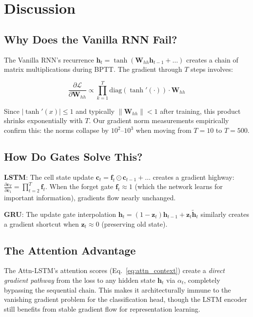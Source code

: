 \documentclass[12pt, a4paper]{article}
\begin{document}
\section{Discussion}

\subsection{Why Does the Vanilla RNN Fail?}

The Vanilla RNN's recurrence $\mathbf{h}_t = \tanh(\mathbf{W}_{hh}\mathbf{h}_{t-1} + \ldots)$ creates a chain of matrix multiplications during BPTT. The gradient through $T$ steps involves:

\begin{equation}
    \frac{\partial \mathcal{L}}{\partial \mathbf{W}_{hh}} \propto \prod_{k=1}^{T} \text{diag}(\tanh'(\cdot)) \cdot \mathbf{W}_{hh}
\end{equation}

Since $|\tanh'(x)| \leq 1$ and typically $\|\mathbf{W}_{hh}\| < 1$ after training, this product shrinks exponentially with $T$. Our gradient norm measurements empirically confirm this: the norms collapse by $10^2$--$10^3$ when moving from $T=10$ to $T=500$.

\subsection{How Do Gates Solve This?}

\textbf{LSTM}: The cell state update $\mathbf{c}_t = \mathbf{f}_t \odot \mathbf{c}_{t-1} + \ldots$ creates a gradient highway: $\frac{\partial \mathbf{c}_T}{\partial \mathbf{c}_1} = \prod_{t=2}^{T} \mathbf{f}_t$. When the forget gate $\mathbf{f}_t \approx 1$ (which the network learns for important information), gradients flow nearly unchanged.

\textbf{GRU}: The update gate interpolation $\mathbf{h}_t = (1-\mathbf{z}_t)\mathbf{h}_{t-1} + \mathbf{z}_t\tilde{\mathbf{h}}_t$ similarly creates a gradient shortcut when $\mathbf{z}_t \approx 0$ (preserving old state).

\subsection{The Attention Advantage}

The Attn-LSTM's attention scores (Eq.~\ref{eq:attn_context}) create a \textit{direct gradient pathway} from the loss to any hidden state $\mathbf{h}_t$ via $\alpha_t$, completely bypassing the sequential chain. This makes it architecturally immune to the vanishing gradient problem for the classification head, though the LSTM encoder still benefits from stable gradient flow for representation learning.
\end{document}
